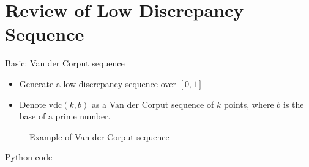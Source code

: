 \hypertarget{review-of-low-discrepancy-sequence}{%
\section{Review of Low Discrepancy
Sequence}\label{review-of-low-discrepancy-sequence}}

\begin{frame}{Basic: Van der Corput sequence}
\protect\hypertarget{basic-van-der-corput-sequence}{}

\begin{itemize}
\item
  Generate a low discrepancy sequence over \([0,1]\)
\item
  Denote \(\mathrm{vdc}(k,b)\) as a Van der Corput sequence of \(k\)
  points, where \(b\) is the base of a prime number.
\end{itemize}

\begin{figure}[hp]
\centering

\caption{Example of Van der Corput sequence}%
\label{fig:vdc}
\end{figure}

\end{frame}

\begin{frame}[fragile]{Python code}
\protect\hypertarget{python-code}{}

\begin{Shaded}
\begin{Highlighting}[]
\OperatorTok{=}\NormalTok{):}
\OperatorTok{=} \NormalTok{, }
\OperatorTok{*=}
\OperatorTok{=} 
\OperatorTok{+=}\OperatorTok{/}

\OperatorTok{=}\NormalTok{):}
     
\end{Highlighting}
\end{Shaded}

\end{frame}

